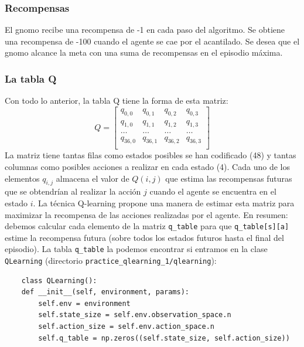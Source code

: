 \documentclass{article}
\begin{document}
\subsubsection{Recompensas}
El gnomo recibe una recompensa de -1 en cada paso del algoritmo. Se obtiene una recompensa de -100 cuando el agente se cae por el acantilado. Se desea que el gnomo alcance la meta con una suma de recompensas en el episodio máxima.






\subsubsection{La tabla Q}
Con todo lo anterior, la tabla Q tiene la forma de esta matriz:
\begin{equation*}
    Q = \begin{bmatrix}
            q_{0,0} & q_{0,1} & q_{0,2} & q_{0,3}\\
            q_{1,0} & q_{1,1} & q_{1,2} & q_{1,3}\\
            \ldots & \ldots & \ldots & \ldots\\
            q_{36,0} & q_{36,1} & q_{36,2} & q_{36,3}\\
        \end{bmatrix}
\end{equation*}
La matriz tiene tantas filas como estados posibles se han codificado (48) y tantas columnas como posibles acciones a realizar en cada estado (4). Cada uno de los elementos $q_{i,j}$ almacena el valor de $Q(i, j)$ que estima las recompensas futuras que se obtendrían al realizar la acción $j$ cuando el agente se encuentra en el estado $i$. La técnica Q-learning propone una manera de estimar esta matriz para maximizar la recompensa de las acciones realizadas por el agente. En resumen: debemos calcular cada elemento de la matriz \texttt{q\_table} para que \texttt{q\_table[s][a]} estime la recompensa futura (sobre todos los estados
futuros hasta el final del episodio). La tabla \texttt{q\_table} la podemos encontrar si entramos en la clase \texttt{QLearning} (directorio \texttt{practice\_qlearning\_1/qlearning}):
\begin{verbatim}
    class QLearning():
    def __init__(self, environment, params):
        self.env = environment
        self.state_size = self.env.observation_space.n
        self.action_size = self.env.action_space.n
        self.q_table = np.zeros((self.state_size, self.action_size))
\end{verbatim}
\end{document}
